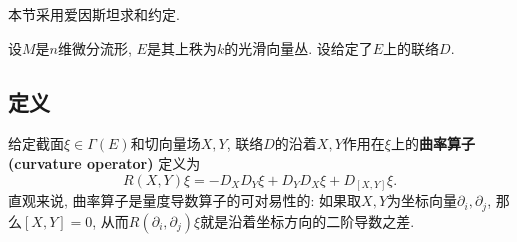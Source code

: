 

本节采用爱因斯坦求和约定.

设$M$是$n$维微分流形, $E$是其上秩为$k$的光滑向量丛. 设给定了$E$上的联络$D$.

\subsection{定义}

给定截面$\xi\in\Gamma(E)$和切向量场$X,Y$, 联络$D$的沿着$X,Y$作用在$\xi$上的\textbf{曲率算子 (curvature operator)} 定义为
$$
R(X,Y)\xi=-D_XD_Y\xi+D_YD_X\xi+D_{[X,Y]}\xi.
$$
直观来说, 曲率算子是量度导数算子的可对易性的: 如果取$X,Y$为坐标向量$\partial_i,\partial_j$, 那么$[X,Y]=0$, 从而$R(\partial_i,\partial_j)\xi$就是沿着坐标方向的二阶导数之差.


